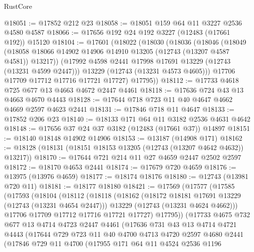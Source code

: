 \begin{lexlean}{RustCore}
\begin{coremodule}
@18051 := @17852 @212 @23
@18058 := @18051 @159 @64 @11 @3227 @2536 @4580 @4587
@18066 := @17656 @192 @24 @192 @3227 (@12483 (@17661 @192)) @15120
@18104 := @17601
    (@18022
      (@18030
        (@18036
          (@18046
            (@18049
              (@18058 @18066 @14902 @14906 @14910 @13205 (@12743 (@13207 @4587 @4581)) @13217))
            (@17992 @4598 @2441 @17998 @17691 @13229 (@12743 (@13231 @4599 @2447)))
            @13229
            (@12743 (@13231 @4573 @4605)))
          @17706
          @17709
          @17712
          @17716
          @17721
          @17727)
        @17795))
@18112 := @17733 @4618 @725 @677 @13 @4663 @4672 @2447 @4461
@18118 := @17636 @724 @43 @13 @4663 @4670 @4443
@18128 := @17644 @718 @723 @11 @40 @4647 @4662 @4669 @2597 @4623 @2441
@18131 := @17846 @718 @11 @4647
@18133 := @17852 @206 @23
@18140 := @18133 @171 @64 @11 @3182 @2536 @4631 @4642
@18148 := @17656 @37 @24 @37 @3182 (@12483 (@17661 @37)) @14897
@18151 := @18140 @18148 @14902 @14906
@18153 := @13187 (@14908 @171)
@18162 := @18128 (@18131 (@18151 @18153 @13205 (@12743 (@13207 @4642 @4632)) @13217))
@18170 := @17644 @721 @214 @11 @27 @4659 @2447 @2502 @2597
@18172 := @18170 @4653 @2441
@18174 := @17679 @720 @4659
@18176 := @13975 (@13976 @4659)
@18177 := @18174 @18176
@18180 := @12743 (@13981 @720 @11)
@18181 := @18177 @18180
@18421 := @17569
    (@17577
      (@17585
        (@17593
          (@18104
            (@18112
              (@18118
                (@18162
                  (@18172 @18181 @17691 @13229 (@12743 (@13231 @4654 @2447)))
                  @13229
                  (@12743 (@13231 @4624 @4662)))
                @17706
                @17709
                @17712
                @17716
                @17721
                @17727)
              @17795))
          (@17733
            @4675
            @732
            @677
            @13
            @4714
            @4723
            @2447
            @4461
            (@17636
              @731
              @43
              @13
              @4714
              @4721
              @4443
              (@17644
                @729
                @723
                @11
                @40
                @4700
                @4713
                @4720
                @2597
                @4680
                @2441
                (@17846
                  @729
                  @11
                  @4700
                  (@17955
                    @171
                    @64
                    @11
                    @4524
                    @2536
                    @1196

\end{coremodule}
\end{lexlean}
